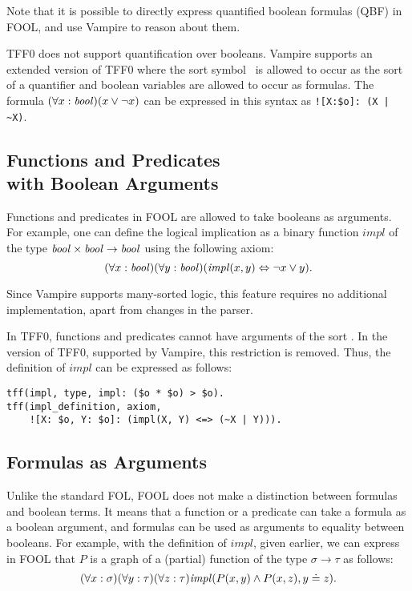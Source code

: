 Note that it is possible to directly express quantified boolean formulas (QBF) in FOOL, and use Vampire to reason about them.

TFF0 does not support quantification over booleans. Vampire supports an extended version of TFF0 where the sort symbol \tptpo\ is allowed to occur as the sort of a quantifier and boolean variables are allowed to occur as formulas. The formula $(\forall x:\mathit{bool})(x \lor \neg x)$ can be expressed in this syntax as \lstinline[language=tptp]{![X:$o]: (X | ~X)}. %

\subsection[Functions and Predicates with Boolean Arguments]{Functions and Predicates\\with Boolean Arguments}

Functions and predicates in FOOL are allowed to take booleans as arguments. For example, one can define the logical implication as a binary function $\mathit{impl}$ of the type $\mathit{bool} \times \mathit{bool} \to \mathit{bool}$ using the following axiom:
\[
  (\forall x: \mathit{bool})(\forall y: \mathit{bool})(\mathit{impl}(x, y) \Leftrightarrow \neg x \lor y).
\]

Since Vampire supports many-sorted logic, this feature requires no additional implementation, apart from changes in the parser.

In TFF0, functions and predicates cannot have arguments of the sort \tptpo. In the version of TFF0, supported by Vampire, this restriction is removed. Thus, the definition of $\mathit{impl}$ can be expressed as follows:
\begin{lstlisting}[language=tptp]
tff(impl, type, impl: ($o * $o) > $o).
tff(impl_definition, axiom,
    ![X: $o, Y: $o]: (impl(X, Y) <=> (~X | Y))).
\end{lstlisting}%

\subsection{Formulas as Arguments}

Unlike the standard FOL, FOOL does not make a distinction between formulas and boolean terms. It means that a function or a predicate can take a formula as a boolean argument, and formulas can be used as arguments to equality between booleans. For example, with the definition of $\mathit{impl}$, given earlier, we can express in FOOL that
$P$ is a graph of a (partial) function of the type $\sigma \to \tau$ as follows:
\begin{equation}\label{eq:bool-arg-example}
  (\forall x:\sigma)(\forall y:\tau)(\forall z:\tau)\mathit{impl}(P(x,y) \land P(x,z), y \doteq z).
\end{equation}

